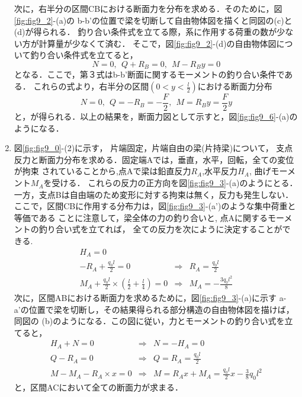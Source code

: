 \documentclass[10pt,a4j]{jarticle}
\begin{document}
\begin{enumerate}
次に，右半分の区間CBにおける断面力を分布を求める．そのために，図\ref{fig:fig9_2}-(a)の
b-b'の位置で梁を切断して自由物体図を描くと同図の(c)と(d)が得られる．
釣り合い条件式を立てる際，系に作用する荷重の数が少ない方が計算量が少なくて済む．
そこで，図\ref{fig:fig9_2}-(d)の自由物体図について釣り合い条件式を立てると，
\begin{equation}
	N=0, \ \ Q+R_B=0, \ \ M-R_By=0
	\label{eqn:}
\end{equation}
となる．ここで，第３式はb-b'断面に関するモーメントの釣り合い条件である．
これらの式より，右半分の区間$(0<y<\frac{l}{2})$における断面力分布
\begin{equation}
	N=0, \ \ Q=-R_B=-\frac{F}{2}, \ \ M=R_By =\frac{F}{2}y
	\label{eqn:}
\end{equation}
と，が得られる．以上の結果を，断面力図として示すと，図\ref{fig:fig9_6}-(a)のようになる．
\item
図\ref{fig:fig9_0}-(2)に示す， 片端固定，片端自由の梁(片持梁)について，
支点反力と断面力分布を求める．固定端Aでは，垂直，水平，回転，全ての変位が拘束
されていることから,点Aで梁は鉛直反力$R_A$,水平反力$H_A$, 曲げモーメント$M_A$を受ける．
これらの反力の正方向を図\ref{fig:fig9_3}-(a)のようにとる．
一方，支点Bは自由端のため変形に対する拘束は無く，反力も発生しない．
ここで，区間CBに作用する分布力は，図\ref{fig:fig9_3}-(a')のような集中荷重と等価である
ことに注意して，梁全体の力の釣り合いと, 点Aに関するモーメントの釣り合い式を立てれば，
全ての反力を次にように決定することができる.
\begin{eqnarray}
	H_A=0 & &  \\
	-R_A+\frac{q_0l}{2}=0 &\Rightarrow & R_A=\frac{q_0l}{2} \\
	M_A+\frac{q_0l}{2}\times \left(\frac{l}{2}+\frac{l}{4}\right)=0
	& \Rightarrow & M_A=-\frac{3q_0l^2}{8}
\end{eqnarray}
次に，区間ABにおける断面力を求めるために，図\ref{fig:fig9_3}-(a)に示す
a-a'の位置で梁を切断し，その結果得られる部分構造の自由物体図を描けば，同図の
(b)のようになる．この図に従い，力とモーメントの釣り合い式を立てると，
\begin{eqnarray}
	H_A+N=0 
	& \Rightarrow & 
	N=-H_A=0
	\label{eqn:} \\
	Q-R_A=0 
	& \Rightarrow & 
	Q=R_A=\frac{q_0l}{2}
	\label{eqn:} \\
	M-M_A-R_A\times x =0 
	& \Rightarrow & 
	M=R_Ax+M_A= \frac{q_0l}{2}x-\frac{3}{8}q_0l^2 
	\label{eqn:}
\end{eqnarray}
と，区間ACにおいて全ての断面力が求まる．


\end{enumerate}
\end{document}

